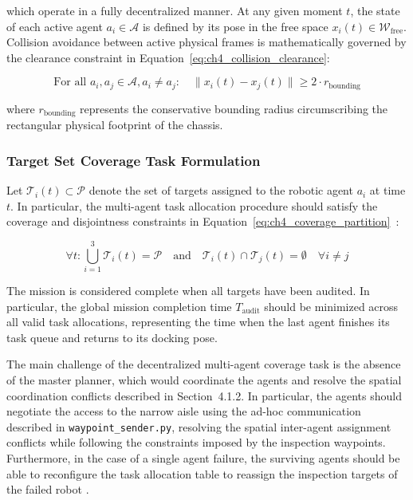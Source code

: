 which operate in a fully decentralized manner. At any given moment $t$, the state of each active agent $a_i \in \mathcal{A}$ is defined by its pose in the free space $x_i(t) \in \mathcal{W}_{\text{free}}$. Collision avoidance between active physical frames is mathematically governed by the clearance constraint in Equation~\eqref{eq:ch4_collision_clearance}:

\begin{equation}
\text{For all } a_i, a_j \in \mathcal{A}, a_i \neq a_j: \quad \|x_i(t) - x_j(t)\| \geq 2 \cdot r_{\text{bounding}} \label{eq:ch4_collision_clearance}
\end{equation}

where $r_{\text{bounding}}$ represents the conservative bounding radius circumscribing the rectangular physical footprint of the chassis.

\subsubsection{Target Set Coverage Task Formulation}

Let $\mathcal{T}_i(t) \subset \mathcal{P}$ denote the set of targets assigned to the robotic agent $a_i$ at time $t$. In particular, the multi-agent task allocation procedure should satisfy the coverage and disjointness constraints in Equation~\eqref{eq:ch4_coverage_partition}~\cite{xu2026energy}:

\begin{equation}
\forall t: \bigcup_{i=1}^{3} \mathcal{T}_i(t) = \mathcal{P} \quad \text{and} \quad \mathcal{T}_i(t) \cap \mathcal{T}_j(t) = \emptyset \quad \forall i \neq j \label{eq:ch4_coverage_partition}
\end{equation}

The mission is considered complete when all targets have been audited. In particular, the global mission completion time $T_{\text{audit}}$ should be minimized across all valid task allocations, representing the time when the last agent finishes its task queue and returns to its docking pose.

The main challenge of the decentralized multi-agent coverage task is the absence of the master planner, which would coordinate the agents and resolve the spatial coordination conflicts described in Section~4.1.2. In particular, the agents should negotiate the access to the narrow aisle using the ad-hoc communication described in \texttt{waypoint\_sender.py}, resolving the spatial inter-agent assignment conflicts while following the constraints imposed by the inspection waypoints. Furthermore, in the case of a single agent failure, the surviving agents should be able to reconfigure the task allocation table to reassign the inspection targets of the failed robot \cite{gong2024resilient}.

